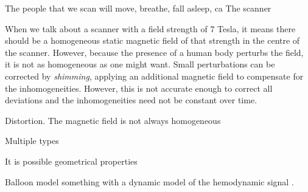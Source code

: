 The people that we scan will move, breathe, fall asleep, ca
The scanner 


When we talk about a scanner with a field strength of 7 Tesla, it means there should be a homogeneous static magnetic field of that strength in the centre of the scanner. However, because the presence of a human body perturbs the field, it is not as homogeneous as one might want. Small perturbations can be corrected by \emph{shimming}, applying an additional magnetic field to compensate for the inhomogeneities. However, this is not accurate enough to correct all deviations and the inhomogeneities need not be constant over time. 


Distortion. The magnetic field is not always homogeneous



Multiple types 


It is possible geometrical properties 


Balloon model \cite{Buxton1998}
something with a dynamic model of the hemodynamic signal \cite{Friston2000}.
















